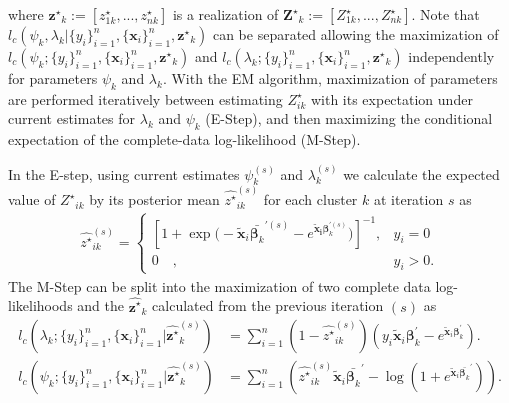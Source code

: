 \documentclass[12pt,letterpaper]{article}
\numberwithin{equation}{section}
\numberwithin{equation}{section}
\numberwithin{equation}{section}
\newcommand{\xTilda}{\tilde{\bm{x}}}
\newcommand{\zZ}{Z^\star}
\newcommand{\zz}{z^\star}
\begin{document}
where $\bm{\zz}_k := \left[\zz_{1k}, ..., \zz_{nk} \right]$ is a realization of $\bm{\zZ}_k  := \left[\zZ_{1k}, ..., \zZ_{nk} \right]$.
% 
 Note that $l_c(\psi_k,\lambda_k|\{y_i\}_{i=1}^n,\{\bm{x}_i\}_{i=1}^n,\bm{\zz}_k)$ can be separated allowing the maximization of $l_c(\psi_k; \{y_i\}_{i=1}^n,\{\bm{x}_i\}_{i=1}^n,\bm{\zz}_k)$ and $l_c(\lambda_k; \{y_i\}_{i=1}^n,\{\bm{x}_i\}_{i=1}^n,\bm{\zz}_k) $ independently for parameters $\psi_k$ and $\lambda_k$. With the EM algorithm, maximization of parameters are performed iteratively between estimating $\zZ_{ik}$ with its expectation under current estimates for $\lambda_k$ and $\psi_k$ (E-Step), and then maximizing the conditional expectation of the complete-data log-likelihood (M-Step). 


In the E-step, using current estimates $\psi_k^{(s)}$ and $ \lambda_k^{(s)} $ %
we calculate the expected value of ${{\zZ}_{ik}}$ by its posterior mean ${\hat{\zz}_{ik}^{(s)}}$ for each cluster $k$ at iteration $s$ as
\begin{align*}
{\hat{\zz}}_{ik}^{(s)} = \begin{cases}  \left[ 1 + \exp{\big(-\xTilda_i \bar{\bm{\beta}_k}^{'(s)} - e^ {\bm{\xTilda_i} \bm{\beta}_k^{'(s)}} \big) } \right]^{-1}, &  y_{i} = 0 \\
  0 \quad , & y_{i}> 0 .
\end{cases}
\end{align*}
%
The M-Step can be split into the maximization of two complete data log-likelihoods and the $\hat{\bm{\zz}}_k$ calculated from the previous iteration $(s)$ as
\begin{align}
 l_c(\lambda_k; \{y_i\}_{i=1}^n,\{\bm{x}_i\}_{i=1}^n| \hat{\bm{\zz}}_k^{(s)}) &= \sum_{i=1}^n (1- \hat{\zz}_{ik}^{(s)}) (y_i \xTilda_i \bm{\beta}_k^{'}  - e^{\xTilda_i \bm{\beta}_k^{'}})\label{eq7}.\\
l_c(\psi_k;\{y_i\}_{i=1}^n,\{\bm{x}_i\}_{i=1}^n|\hat{\bm{\zz}}_k^{(s)}) &=\sum_{i=1}^n \left( \hat{\zz}_{ik}^{(s)} \xTilda_i \bar{\bm{\beta}_k }^{'} - \log \left(1+ e^{ \xTilda_i \bar{\bm{\beta}_k }^{'}} \right) \right). \label{eq6}   
 \end{align}
\end{document}
